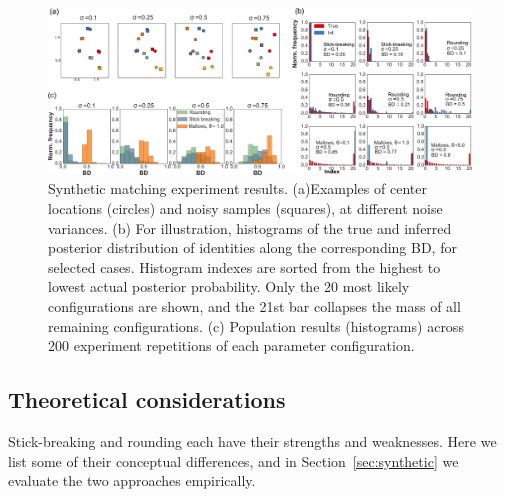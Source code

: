 \documentclass[twoside]{article}
\begin{document}
\begin{figure}[ht] 
   \centering
   \includegraphics[width=1.0\textwidth]{../figures/figure8.pdf}
   \caption{Synthetic matching experiment results. (a)Examples of center locations (circles) and noisy samples (squares), at different noise variances. (b) For illustration, histograms of the true and inferred posterior distribution of identities along the corresponding BD, for selected cases. Histogram indexes are sorted from the highest to lowest actual posterior probability. Only the 20 most likely configurations are shown, and the 21st bar collapses the mass of all remaining configurations. (c) Population results (histograms) across 200 experiment repetitions of each parameter configuration.}
   \label{fig:synthetic}
\end{figure}

\subsection{Theoretical considerations}

Stick-breaking and rounding each have their strengths and weaknesses.
Here we list some of their conceptual differences, and in
Section~\ref{sec:synthetic} we evaluate the two approaches
empirically.
\end{document}
